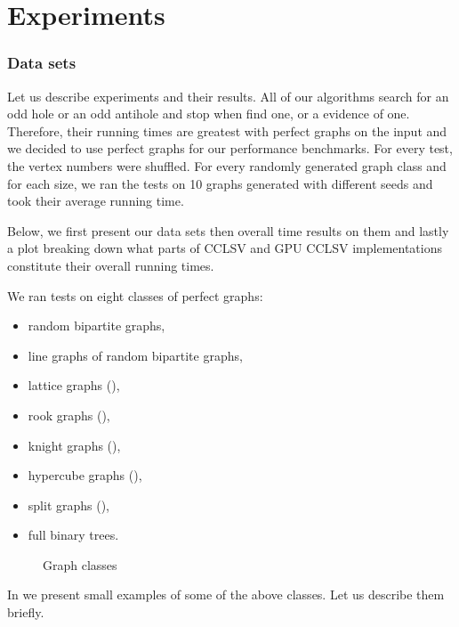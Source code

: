 \section{Experiments}
\label{sec:experiments}

\subsubsection{Data sets}

Let us describe experiments and their results. All of our algorithms search for an odd hole or an odd antihole and stop when find one, or a evidence of one. Therefore, their running times are greatest with perfect graphs on the input and we decided to use perfect graphs for our performance benchmarks. For every test, the vertex numbers were shuffled. For every randomly generated graph class and for each size, we ran the tests on 10 graphs generated with different seeds and took their average running time.

Below, we first present our data sets then overall time results on them and lastly a plot breaking down what parts of CCLSV and GPU CCLSV implementations constitute their overall running times.

We ran tests on eight classes of perfect graphs:
\begin{itemize}
  \item random bipartite graphs,
  \item line graphs of random bipartite graphs,
  \item lattice graphs (),
  \item rook graphs (),
  \item knight graphs (),
  \item hypercube graphs (),
  \item split graphs (),
  \item full binary trees.
\end{itemize}


\begin{figure}
  
  \caption{Graph classes}
  \label{fig:graphClasses}
\end{figure}

In  we present small examples of some of the above classes. Let us describe them briefly.

